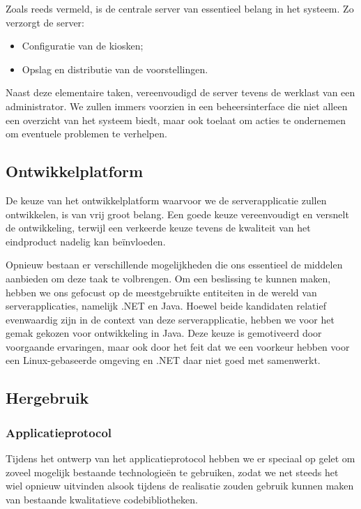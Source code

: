 Zoals reeds vermeld, is de centrale server van essentieel belang in het systeem. Zo verzorgt de server:
\begin{itemize}
\item Configuratie van de kiosken;
\item Opslag en distributie van de voorstellingen.
\end{itemize}

Naast deze elementaire taken, vereenvoudigd de server tevens de werklast van een administrator. We zullen immers voorzien in een beheersinterface die niet alleen een overzicht van het systeem biedt, maar ook toelaat om acties te ondernemen om eventuele problemen te verhelpen.

\subsection{Ontwikkelplatform}

De keuze van het ontwikkelplatform waarvoor we de serverapplicatie zullen ontwikkelen, is van vrij groot belang. Een goede keuze vereenvoudigt en versnelt de ontwikkeling, terwijl een verkeerde keuze tevens de kwaliteit van het eindproduct nadelig kan beïnvloeden.

Opnieuw bestaan er verschillende mogelijkheden die ons essentieel de middelen aanbieden om deze taak te volbrengen. Om een beslissing te kunnen maken, hebben we ons gefocust op de meestgebruikte entiteiten in de wereld van serverapplicaties, namelijk .NET en Java. Hoewel beide kandidaten relatief evenwaardig zijn in de context van deze serverapplicatie, hebben we voor het gemak gekozen voor ontwikkeling in Java. Deze keuze is gemotiveerd door voorgaande ervaringen, maar ook door het feit dat we een voorkeur hebben voor een Linux-gebaseerde omgeving en .NET daar niet goed met samenwerkt.

\subsection{Hergebruik}

\subsubsection{Applicatieprotocol}

Tijdens het ontwerp van het applicatieprotocol hebben we er speciaal op gelet om zoveel mogelijk bestaande technologieën te gebruiken, zodat we net steeds het wiel opnieuw uitvinden alsook tijdens de realisatie zouden gebruik kunnen maken van bestaande kwalitatieve codebibliotheken.

